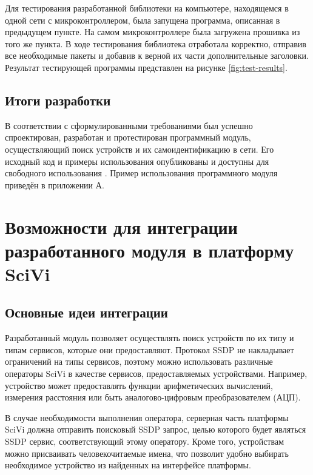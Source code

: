 Для тестирования разработанной библиотеки на компьютере, находящемся в одной сети с микроконтроллером, была запущена программа, описанная в предыдущем пункте.
На самом микроконтроллере была загружена прошивка из того же пункта.
В ходе тестирования библиотека отработала корректно, отправив все необходимые пакеты и добавив к верной их части дополнительные заголовки.
Результат тестирующей программы представлен на рисунке \ref{fig:test-results}.


\subsection{Итоги разработки}

В соответствии с сформулированными требованиями был успешно спроектирован, разработан и протестирован программный модуль, осуществляющий поиск устройств и их самоидентификацию в сети.
Его исходный код и примеры использования опубликованы и доступны для свободного использования \cite{web:almiluk-ssdp}.
Пример использования программного модуля приведён в приложении А.


\section{Возможности для интеграции разработанного модуля в платформу SciVi}

\subsection{Основные идеи интеграции}

Разработанный модуль позволяет осуществлять поиск устройств по их типу и типам сервисов, которые они предоставляют.
Протокол SSDP не накладывает ограничений на типы сервисов, поэтому можно использовать различные операторы SciVi в качестве сервисов, предоставляемых устройствами.
Например, устройство может предоставлять функции арифметических вычислений, измерения расстояния или быть аналогово-цифровым преобразователем (АЦП).

В случае необходимости выполнения оператора, серверная часть платформы SciVi должна отправить поисковый SSDP запрос, целью которого будет являться SSDP сервис, соответствующий этому оператору.
Кроме того, устройствам можно присваивать человекочитаемые имена, что позволит удобно выбирать необходимое устройство из найденных на интерфейсе платформы.

